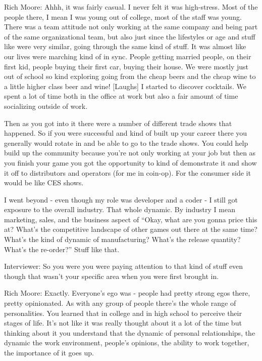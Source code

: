 \textcolor{interviewee}{Rich Moore:} Ahhh, it was fairly casual. I never felt it was high-stress. Most of the people there, I mean I was young out of college, most of the staff was young. There was a team attitude not only working at the same company and being part of the same organizational team, but also just since the lifestyles or age and stuff like were very similar, going through the same kind of stuff. It was almost like our lives were marching kind of in sync. People getting married people, on their first kid, people buying their first car, buying their house. We were mostly just out of school so kind exploring going from the cheap beers and the cheap wine to a little higher class beer and wine! [Laughs] I started to discover cocktails. We spent a lot of time both in the office at work but also a fair amount of time socializing outside of work.

Then as you got into it there were a number of different trade shows that happened. So if you were successful and kind of built up your career there you generally would rotate in and be able to go to the trade shows. You could help build up the community because you're not only working at your job but then as you finish your game you got the opportunity to kind of demonstrate it and show it off to distributors and operators (for me in coin-op). For the consumer side it would be like CES shows.

I went beyond - even though my role was developer and a coder - I still got exposure to the overall industry. That whole dynamic. By industry I mean marketing, sales, and the business aspect of “Okay, what are you gonna price this at? What's the competitive landscape of other games out there at the same time? What's the kind of dynamic of manufacturing? What's the release quantity? What’s the re-order?” Stuff like that.

\textcolor{interviewer}{Interviewer:} So you were you were paying attention to that kind of stuff even though that wasn't your specific area when you were first brought in.

\textcolor{interviewee}{Rich Moore:} Exactly. Everyone’s ego was - people had pretty strong egos there, pretty opinionated. As with any group of people there's the whole range of personalities. You learned that in college and in high school to perceive their stages of life. It's not like it was really thought about it a lot of the time but thinking about it you understand that the dynamic of personal relationships, the dynamic the work environment, people's opinions, the ability to work together, the importance of it goes up. 

